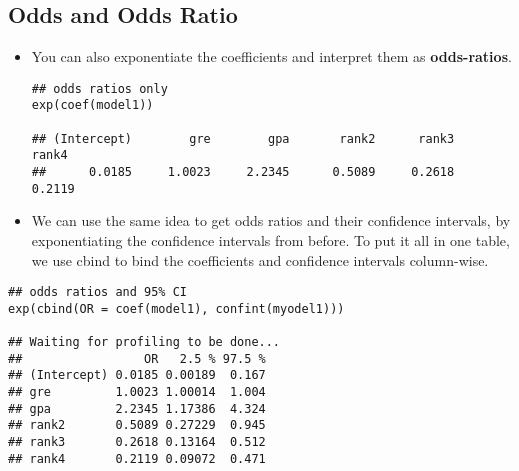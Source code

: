 \documentclass[]{article}
\begin{document}
\newpage
\subsection{Odds and Odds Ratio}
\begin{itemize}
\item You can also exponentiate the coefficients and interpret them as \textbf{odds-ratios}. 
\begin{framed}
\begin{verbatim}
## odds ratios only
exp(coef(model1))

## (Intercept)        gre        gpa       rank2      rank3      rank4 
##      0.0185     1.0023     2.2345      0.5089     0.2618     0.2119
\end{verbatim}
\end{framed}
\item We can use the same idea to get odds ratios and their confidence intervals, by exponentiating the confidence intervals from before. To put it all in one table, we use cbind to bind the coefficients and confidence intervals column-wise.
\end{itemize}


\begin{framed}
\begin{verbatim}
## odds ratios and 95% CI
exp(cbind(OR = coef(model1), confint(myodel1)))

## Waiting for profiling to be done...
##                 OR   2.5 % 97.5 %
## (Intercept) 0.0185 0.00189  0.167
## gre         1.0023 1.00014  1.004
## gpa         2.2345 1.17386  4.324
## rank2       0.5089 0.27229  0.945
## rank3       0.2618 0.13164  0.512
## rank4       0.2119 0.09072  0.471
\end{verbatim}
\end{framed}
\end{document}
